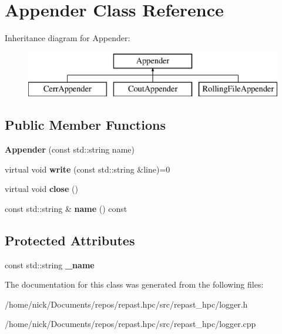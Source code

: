 \hypertarget{class_appender}{\section{Appender Class Reference}
\label{class_appender}
}
Inheritance diagram for Appender\-:\begin{figure}[H]
\begin{center}
\leavevmode
\includegraphics[height=2.000000cm]{class_appender}
\end{center}
\end{figure}
\subsection*{Public Member Functions}
\begin{DoxyCompactItemize}
\item 
\hypertarget{class_appender_a2ad482c763a284fdb8d3dd46c83481ab}{{\bfseries Appender} (const std\-::string name)}\label{class_appender_a2ad482c763a284fdb8d3dd46c83481ab}

\item 
\hypertarget{class_appender_a0e67ca1a0f85984feb8b3088f764b6e7}{virtual void {\bfseries write} (const std\-::string \&line)=0}\label{class_appender_a0e67ca1a0f85984feb8b3088f764b6e7}

\item 
\hypertarget{class_appender_ab042540fad5293516d82b9430e110aed}{virtual void {\bfseries close} ()}\label{class_appender_ab042540fad5293516d82b9430e110aed}

\item 
\hypertarget{class_appender_ae043a5d21e342d46243c12e79cd4e256}{const std\-::string \& {\bfseries name} () const }\label{class_appender_ae043a5d21e342d46243c12e79cd4e256}

\end{DoxyCompactItemize}
\subsection*{Protected Attributes}
\begin{DoxyCompactItemize}
\item 
\hypertarget{class_appender_a6e4dd248b35257d47a5e7befad4ef6aa}{const std\-::string {\bfseries \-\_\-name}}\label{class_appender_a6e4dd248b35257d47a5e7befad4ef6aa}

\end{DoxyCompactItemize}


The documentation for this class was generated from the following files\-:\begin{DoxyCompactItemize}
\item 
/home/nick/\-Documents/repos/repast.\-hpc/src/repast\-\_\-hpc/logger.\-h\item 
/home/nick/\-Documents/repos/repast.\-hpc/src/repast\-\_\-hpc/logger.\-cpp\end{DoxyCompactItemize}
